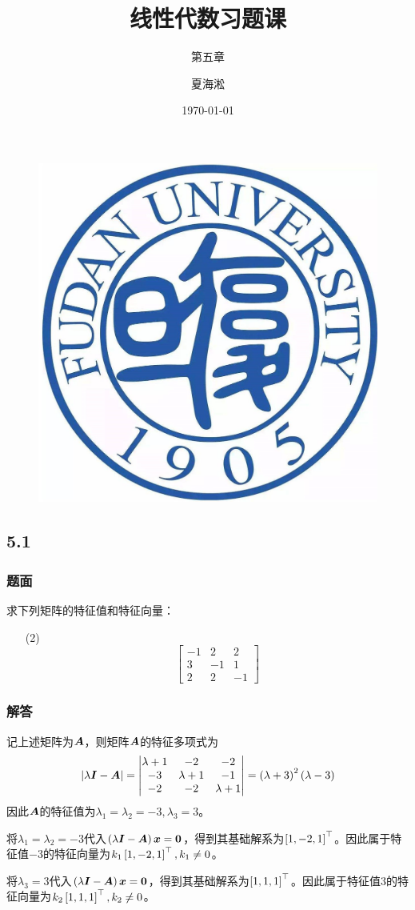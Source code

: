 \documentclass{beamer}
\author{夏海淞}
\title{线性代数习题课}
\subtitle{第五章}
\date{\today}
\begin{document}
\setlength{\parskip}{0.45\baselineskip}

\begin{frame}
    \titlepage
    \begin{figure}[htpb]
        \begin{center}
            \vspace*{-0.5cm}
            \includegraphics[width=0.1\linewidth]{../../pic/FDU.jpeg}
        \end{center}
    \end{figure}
\end{frame}

\subsection*{5.1}
\begin{frame}
    \frametitle{题面}
    求下列矩阵的特征值和特征向量：
    \begin{enumerate}
        \item[(2)]{
                    \begin{equation*}
                        \begin{bmatrix}
                            -1 & 2  & 2  \\
                            3  & -1 & 1  \\
                            2  & 2  & -1
                        \end{bmatrix}
                    \end{equation*}
              }
    \end{enumerate}
\end{frame}

\begin{frame}
    \frametitle{解答}
    记上述矩阵为\(\boldsymbol{A}\)，则矩阵\(\boldsymbol{A}\)的特征多项式为
    \begin{equation*}
        \left|\lambda\boldsymbol{I}-\boldsymbol{A} \right| =
        \begin{vmatrix}
            \lambda+1 & -2        & -2        \\
            -3        & \lambda+1 & -1        \\
            -2        & -2        & \lambda+1
        \end{vmatrix}=\left( \lambda+3 \right)^2\left( \lambda-3 \right)
    \end{equation*}
    因此\(\boldsymbol{A}\)的特征值为\(\lambda_1=\lambda_2=-3,\lambda_3=3\)。
    \pause

    将\(\lambda_1=\lambda_2=-3\)代入\(\left( \lambda\boldsymbol{I}-\boldsymbol{A} \right)\boldsymbol{x}=\boldsymbol{0}\)，得到其基础解系为\(\left[ 1,-2,1 \right]^\top\)。因此属于特征值\(-3\)的特征向量为\(k_1\left[ 1,-2,1 \right]^\top,k_1\neq0\)。

    将\(\lambda_3=3\)代入\(\left( \lambda\boldsymbol{I}-\boldsymbol{A} \right)\boldsymbol{x}=\boldsymbol{0}\)，得到其基础解系为\(\left[ 1,1,1 \right]^\top\)。因此属于特征值\(3\)的特征向量为\(k_2\left[ 1,1,1 \right]^\top,k_2\neq0\)。
\end{frame}
\end{document}
